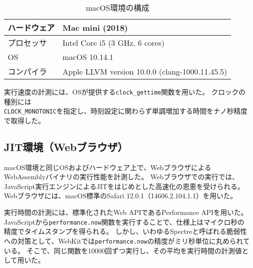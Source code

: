 \begin{table}[htbp]
  \label{tab:mac_spec}
  \caption{macOS環境の構成}
  \begin{center}
    \begin{tabular}{|l|l|}
    \hline
    ハードウェア & Mac mini (2018) \\ \hline
    プロセッサ & Intel Core i5 (3 GHz, 6 cores) \\ \hline
    OS & macOS 10.14.1 \\ \hline
    コンパイラ & Apple LLVM version 10.0.0 (clang-1000.11.45.5) \\ \hline
    \end{tabular}
  \end{center}
\end{table}

実行速度の計測には、OSが提供する\verb|clock_gettime|関数を用いた。
クロックの種別には \\
\verb|CLOCK_MONOTONIC|を指定し、時刻設定に関わらず単調増加する時間をナノ秒精度で取得した。

\subsection{JIT環境（Webブラウザ）}

macOS環境と同じOSおよびハードウェア上で、WebブラウザによるWebAssemblyバイナリの実行性能を計測した。
Webブラウザでの実行では、JavaScript実行エンジンによるJITをはじめとした高速化の恩恵を受けられる。
Webブラウザには、macOS標準のSafari 12.0.1（14606.2.104.1.1）を用いた。

実行時間の計測には、標準化されたWeb APIであるPerformance APIを用いた。
JavaScriptから\verb|performance.now|関数を実行することで、仕様上はマイクロ秒の精度でタイムスタンプを得られる。
しかし、いわゆるSpectreと呼ばれる脆弱性への対策として、WebKitでは\verb|performance.now|の精度がミリ秒単位に丸められている\cite{webkit_spectre}\cite{webkit_trac}。
そこで、同じ関数を10000回ずつ実行し、その平均を実行時間の計測値として用いた。

